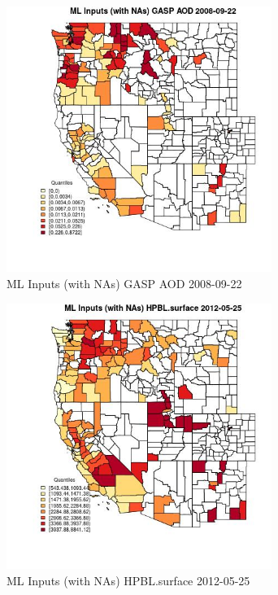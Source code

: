 \begin{figure} 
\centering  
\includegraphics[width=0.77\textwidth]{Code_Outputs/Report_ML_input_PM25_Step4_part_e_de_duplicated_aves_compiled_2019-05-18wNAs_CountyGASP_AODMean2008-09-22_2008-09-22.jpg} 
\caption{\label{fig:Report_ML_input_PM25_Step4_part_e_de_duplicated_aves_compiled_2019-05-18wNAsCountyGASP_AODMean2008-09-22_2008-09-22}ML Inputs (with NAs) GASP AOD 2008-09-22} 
\end{figure} 
 

\begin{figure} 
\centering  
\includegraphics[width=0.77\textwidth]{Code_Outputs/Report_ML_input_PM25_Step4_part_e_de_duplicated_aves_compiled_2019-05-18wNAs_CountyHPBLsurfaceMean2012-05-25_2012-05-25.jpg} 
\caption{\label{fig:Report_ML_input_PM25_Step4_part_e_de_duplicated_aves_compiled_2019-05-18wNAsCountyHPBLsurfaceMean2012-05-25_2012-05-25}ML Inputs (with NAs) HPBL.surface 2012-05-25} 
\end{figure} 
 

